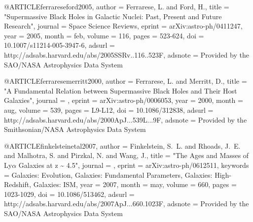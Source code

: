 {{{{{{{{{{{{{{{{{{%

@ARTICLE{ferrareseford2005,
   author = {{Ferrarese}, L. and {Ford}, H.},
    title = "{Supermassive Black Holes in Galactic Nuclei: Past, Present and Future Research}",
  journal = {Space Science Reviews},
   eprint = {arXiv:astro-ph/0411247},
     year = 2005,
    month = feb,
   volume = 116,
    pages = {523-624},
      doi = {10.1007/s11214-005-3947-6},
   adsurl = {http://adsabs.harvard.edu/abs/2005SSRv..116..523F},
  adsnote = {Provided by the SAO/NASA Astrophysics Data System}
}




@ARTICLE{ferraresemerritt2000,
   author = {{Ferrarese}, L. and {Merritt}, D.},
    title = "{A Fundamental Relation between Supermassive Black Holes and Their Host Galaxies}",
  journal = {\apjl},
   eprint = {arXiv:astro-ph/0006053},
     year = 2000,
    month = aug,
   volume = 539,
    pages = {L9-L12},
      doi = {10.1086/312838},
   adsurl = {http://adsabs.harvard.edu/abs/2000ApJ...539L...9F},
  adsnote = {Provided by the Smithsonian/NASA Astrophysics Data System}
}

@ARTICLE{finkelsteinetal2007,
   author = {{Finkelstein}, S.~L. and {Rhoads}, J.~E. and {Malhotra}, S. and 
	{Pirzkal}, N. and {Wang}, J.},
    title = "{The Ages and Masses of Ly{$\alpha$} Galaxies at z \~{} 4.5}",
  journal = {\apj},
   eprint = {arXiv:astro-ph/0612511},
 keywords = {Galaxies: Evolution, Galaxies: Fundamental Parameters, Galaxies: High-Redshift, Galaxies: ISM},
     year = 2007,
    month = may,
   volume = 660,
    pages = {1023-1029},
      doi = {10.1086/513462},
   adsurl = {http://adsabs.harvard.edu/abs/2007ApJ...660.1023F},
  adsnote = {Provided by the SAO/NASA Astrophysics Data System}
}

}}}}}}}}}}}}}}}}}}
